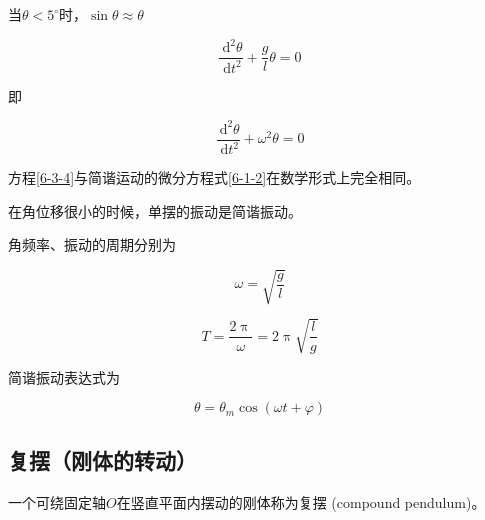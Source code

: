 \documentclass[12pt, a4paper]{article}
\numberwithin{equation}{section}
\newcommand{\degree}{^{\circ}}
\newcommand{\rmd}{\mathrm{~d}}
\begin{document}
    当\(\theta < 5\degree\)时，\(\sin \theta \approx \theta\)

    \begin{equation}
        \frac{\rmd^2 \theta}{\rmd t^2} + \frac{g}{l}\theta = 0
    \end{equation}

    即

    \begin{equation}
        \frac{\rmd^2 \theta}{\rmd t^2} + \omega^2 \theta = 0
        \label{6-3-4}
    \end{equation}

    方程\ref{6-3-4}与简谐运动的微分方程式\ref{6-1-2}在数学形式上完全相同。

    在角位移很小的时候，单摆的振动是简谐振动。

    角频率、振动的周期分别为

    \begin{equation}
        \omega = \sqrt{\frac{g}{l}}
    \end{equation}

    \begin{equation}
        T = \frac{2 \uppi}{\omega} = 2 \uppi \sqrt{\frac{l}{g}}
    \end{equation}

    简谐振动表达式为

    \begin{equation}
        \theta = \theta_m \cos \left(\omega t + \varphi\right)
    \end{equation}

\subsection{复摆（刚体的转动）}

    一个可绕固定轴\(O\)在竖直平面内摆动的刚体称为复摆 (compound pendulum)。
\end{document}

